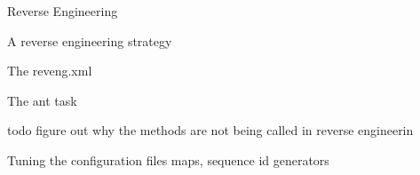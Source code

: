 Reverse Engineering

A reverse engineering strategy

The reveng.xml

The ant task


todo figure out why the methods are not being called in reverse engineerin


Tuning the configuration files maps, sequence id generators 